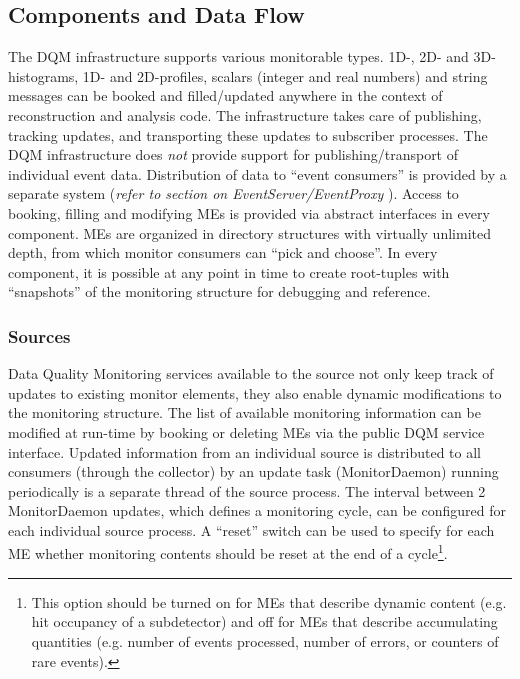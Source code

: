 \documentclass[a4paper]{cmspaper}
\newcommand{\pdfbookmark}[3][1]{}
\begin{document}
\subsection{Components and Data Flow}\label{sec:dataflow}
%
\label{sec:req_general}
The DQM infrastructure supports various monitorable types.
1D-, 2D- and 3D-histograms,
1D- and 2D-profiles, scalars (integer and real numbers) and string messages
can be booked and filled/updated anywhere in the
context of reconstruction and analysis code.
The infrastructure takes
care of publishing, tracking updates, and transporting these updates to
subscriber processes. The
DQM infrastructure does \emph{not} provide support for publishing/transport of individual event
data. Distribution of data to ``event consumers'' is provided by a separate
system ({\it refer to section on EventServer/EventProxy} ).
Access to booking, filling and modifying MEs is provided via abstract
interfaces in every component. MEs are organized in
directory
structures with
virtually unlimited depth, from which monitor consumers can ``pick
and choose''.
In every component, it is possible at any point in time to create
root-tuples with ``snapshots''
of the monitoring structure for debugging and reference.

\subsubsection{Sources}
\label{sec:req_sources}

Data Quality Monitoring services available to the source not only keep track of updates to
existing monitor elements, they also enable dynamic modifications to the
monitoring structure. The list of available monitoring information
can be modified at run-time by booking or deleting MEs via the public
DQM service interface.
Updated information from an individual source is distributed to all
consumers (through the collector) by an update
task (MonitorDaemon) running periodically is a separate thread of the source
process.
The interval between 2 MonitorDaemon updates,
which defines a monitoring cycle, can be configured
for each individual source process.
A ``reset'' switch can be used to specify for each ME
whether monitoring contents
should be reset at the end of a cycle\footnote{This option should be
turned on for MEs that describe dynamic content (e.g. hit
occupancy of a subdetector) and off for MEs that describe
accumulating quantities (e.g. number of events processed, number of
errors, or counters of rare events).}.
\end{document}
